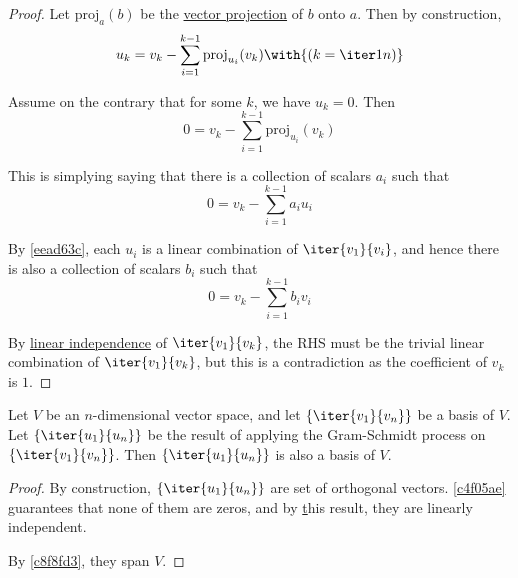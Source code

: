 \begin{proof}
  \def\proj{\mathrm{proj}}

  Let $\proj_a(b)$ be the \href{fc332ef}{vector projection} of $b$ onto $a$.
  Then by construction,
  $$
    u_k=v_k-\sum_{i=1}^{k-1}\proj_{u_i}(v_k)\with{(k=\iter1n)}
  $$

  Assume on the contrary that for some $k$, we have $u_k=0$. Then
  $$
    0=v_k-\sum_{i=1}^{k-1}\proj_{u_i}(v_k)
  $$

  This is simplying saying that there is a collection of scalars $a_i$ such
  that
  $$
    0=v_k-\sum_{i=1}^{k-1}a_iu_i
  $$

  By \autoref{eead63c}, each $u_i$ is a linear combination of
  $\iter{v_1}{v_i}$, and hence there is also a collection of scalars $b_i$ such
  that
  $$
    0=v_k-\sum_{i=1}^{k-1}b_iv_i
  $$

  By \href{c133a44}{linear independence} of $\iter{v_1}{v_k}$, the RHS must be
  the trivial linear combination of $\iter{v_1}{v_k}$, but this is a
  contradiction as the coefficient of $v_k$ is $1$.
\end{proof}

\label{c39f052}

Let $V$ be an $n$-dimensional vector space, and let $\{\iter{v_1}{v_n}\}$ be a
basis of $V$. Let $\{\iter{u_1}{u_n}\}$ be the result of applying the
Gram-Schmidt process on $\{\iter{v_1}{v_n}\}$. Then $\{\iter{u_1}{u_n}\}$ is
also a basis of $V$.

\begin{proof}
  By construction, $\{\iter{u_1}{u_n}\}$ are set of orthogonal vectors.
  \autoref{c4f05ae} guarantees that none of them are zeros, and by
  \href{c0eb6f5} this result, they are linearly independent.

  By \autoref{c8f8fd3}, they span $V$.
\end{proof}
